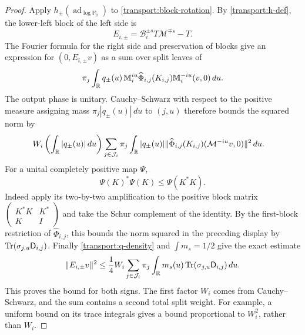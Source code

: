 \begin{proof}
Apply $h_\pm(\operatorname{ad}_{\log\mathbb M_i})$ to
\eqref{transport:block-rotation}.  By \eqref{transport:h-def}, the
lower-left block of the left side is
\begin{equation}\label{transport:E-def}
 E_{i,\pm}=\mathcal B_i^{\pm s}T\mathcal M^{\mp s}-T.
\end{equation}
The Fourier formula for the right side and preservation of blocks give
an expression for $(0,E_{i,\pm}v)$ as a sum over split leaves of
\[
 \pi_j\int_{\mathbb R}q_\pm(u)\,
 \mathbb M_i^{iu}\widehat\Phi_{i,j}(K_{i,j})
 \mathbb M_i^{-iu}(v,0)\,du.
\]
The output phase is unitary.  Cauchy--Schwarz with respect to the
positive measure assigning mass $\pi_j|q_\pm(u)|\,du$ to $(j,u)$
therefore bounds the squared norm by
\begin{align*}
 &W_i\left(\int_{\mathbb R}|q_\pm(u)|\,du\right)
 \sum_{j\in\mathcal J_i}\pi_j\int_{\mathbb R}|q_\pm(u)|
 \lVert \widehat\Phi_{i,j}(K_{i,j})(\mathcal M^{-iu}v,0)\rVert^2\,du.
\end{align*}
For a unital completely positive map $\Psi$,
\begin{equation}\label{transport:cp-schwarz}
 \Psi(K)^*\Psi(K)\leq\Psi(K^*K).
\end{equation}
Indeed apply its two-by-two amplification to the positive block matrix
$\left(\begin{smallmatrix}K^*K&K^*\\K&I\end{smallmatrix}\right)$ and
take the Schur complement of the identity.  By the first-block
restriction of $\widehat\Phi_{i,j}$, this bounds the norm squared in
the preceding display by $\operatorname{Tr}(\sigma_{j,u}\mathsf D_{i,j})$.
Finally \eqref{transport:q-density} and $\int m_s=1/2$ give the exact
estimate
\begin{equation}\label{transport:block-bound}
 \lVert E_{i,\pm}v\rVert^2
 \leq\frac14 W_i\sum_{j\in\mathcal J_i}\pi_j
       \int_{\mathbb R}m_s(u)\operatorname{Tr}(\sigma_{j,u}\mathsf D_{i,j})\,du.
\end{equation}
This proves the bound for both signs.  The first factor $W_i$ comes
from Cauchy--Schwarz, and the sum contains a second total split weight.
For example, a uniform bound on its trace integrals gives a bound
proportional to $W_i^2$, rather than $W_i$.


\end{proof}
